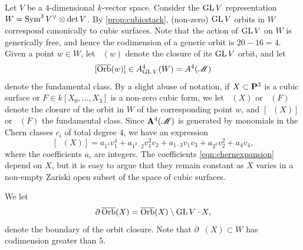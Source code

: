 \documentclass[12pt,reqno]{amsart}
\renewcommand{\k}{k}
\DeclareMathOperator{\Orb}{\overline{Orb}}
\numberwithin{equation}{section}
\begin{document}
Let $V$ be a $4$-dimensional $\k$-vector space.
Consider the $\GL V$ representation $W = \Sym^3 V^\vee \otimes \det V$.
By \autoref{prop:cubicstack}, (non-zero) $\GL V$ orbits in $W$ correspond canonically to cubic surfaces.
Note that the action of $\GL V$ on $W$ is generically free, and hence the codimension of a generic orbit is $20-16 = 4$.
Given a point $w \in W$, let $\Orb(w)$ denote the closure of its $\GL V$ orbit, and let
\[ [\Orb(w)] \in A^4_{\GL V}(W) = A^4(\mathscr M)\]
denote the fundamental class.
By a slight abuse of notation, if $X \subset \P^3$ is a cubic surface or $F \in k[X_0, \dots, X_3]$ is a non-zero cubic form, we let $\Orb(X)$ or $\Orb(F)$ denote the closure of the orbit in $W$ of the corresponding point $w$, and $[\Orb(X)]$ or $\Orb(F)$ the fundamental class.
Since $\A^4(\mathscr M)$ is generated by monomials in the Chern classes $c_i$ of total degree 4, we have an expression
\begin{equation}\label{eqn:chernexpansion}
  [\Orb(X)] = a_{1^4}v_1^4 + a_{1^2\cdot 2} v_1^2v_2 + a_{1\cdot 3} v_1v_3 + a_{2^2}v_2^2 + a_4 v_4,
\end{equation}
where the coefficients $a_i$ are integers.
The coefficients \eqref{eqn:chernexpansion} depend on $X$, but it is easy to argue that they remain constant as $X$ varies in a non-empty Zariski open subset of the space of cubic surfaces.

We let
\[ \partial \Orb(X) = \Orb(X) \setminus \GL V \cdot X,\]
denote the boundary of the orbit closure.
Note that $\partial \Orb(X) \subset W$ has codimension greater than $5$.
\end{document}
